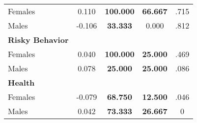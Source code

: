 \begin{tabular}{l c c c c}
\quad Females &      0.110 & \textbf{  100.000} & \textbf{   66.667} & .715 \\
\quad Males &     -0.106 & \textbf{   33.333} &     0.000 & .812 \\
\midrule
\textbf{Risky Behavior} & & & & \\
\quad Females &      0.040 & \textbf{  100.000} & \textbf{   25.000} & .469 \\
\quad Males &      0.078 & \textbf{   25.000} & \textbf{   25.000} & .086 \\
\midrule
\textbf{Health} & & & & \\
\quad Females &     -0.079 & \textbf{   68.750} & \textbf{   12.500} & .046 \\
\quad Males &      0.042 & \textbf{   73.333} & \textbf{   26.667} & 0 \\
\bottomrule
\end{tabular}
